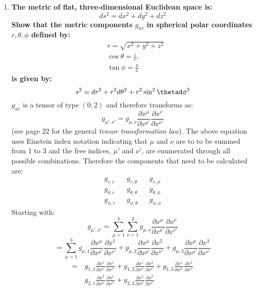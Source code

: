 \documentclass[a4paper]{article}
\begin{document}
\begin{enumerate}
\begin{enumerate}
  \item \textbf{The metric of flat, three-dimensional Euclidean space is:} \[
      ds^2 = dx^2 + dy^2 + dz^2
  \]
  \textbf{Show that the metric components $g_{uv}$ in spherical polar
  coordinates $r, \theta, \phi$ defined by:}
  \[
    \begin{align*}
      &r = \sqrt{x^2 + y^2 + z^2} \\
      &\cos\theta = \frac{z}{r}, \\
      &\tan\phi = \frac{y}{x}
    \end{align*}
  \]
  \textbf{is given by:}
  \[
    s^2 = dr^2 + r^2 d\theta^2 + r^2 \sin^2\thetad\phi^2
  \]
 $g_{uv}$ is a tensor of type $\left( 0,2 \right) $ and therefore transforms as:
  \[
    g_{\mu',\nu'} = g_{\mu,\nu} \frac{\partial x^\mu}{\partial x^{\mu'}}\frac{\partial x^\nu}{\partial x^{\nu'}}
  \]
  (see page 22 for the general \textit{tensor transformation law}). The above
  equation uses Einstein index notation indicating that $\mu$ and $\nu$ are to
  to be summed from 1 to 3 and the free indices, $\mu'$ and $\nu'$, are
  enumerated through all possible combinations. Therefore the components that
  need to be calculated are:
  \[
    \begin{matrix}
      g_{r,r}  && g_{r,\theta} && g_{r,\phi} \\
      g_{\theta, r} && g_{\theta,\theta} && g_{\theta,\phi} \\
      g_{\phi,r} && g_{\phi,\theta} && g_{\phi,\phi}
    \end{matrix}
  \]
  Starting with:
  \[
    g_{\mu',\nu'} =
    \sum_{\mu=1}^{3} \sum_{\nu=1}^{3} g_{\mu,\nu} \frac{\partial x^\mu}{\partial x^{\mu'}} \frac{\partial x^\nu}{\partial x^{\nu'}}
  \]
  \[
    = \sum_{\mu=1}^{3}
    g_{\mu, 1} \frac{\partial x^\mu}{\partial x^{\mu'}} \frac{\partial x^1}{\partial x^{\nu'}} +
    g_{\mu, 2} \frac{\partial x^\mu}{\partial x^{\mu'}} \frac{\partial x^2}{\partial x^{\nu'}} +
    g_{\mu, 3} \frac{\partial x^\mu}{\partial x^{\mu'}} \frac{\partial x^3}{\partial x^{\nu'}}
  \]
  \[
    \begin{align*}
    =&\
     g_{1,1}\frac{\partial x^1}{\partial x^{\mu'}}\frac{\partial x^1}{\partial x^{\nu'}}
    +g_{1,2}\frac{\partial x^1}{\partial x^{\mu'}}\frac{\partial x^2}{\partial x^{\nu'}}
    +g_{1,3}\frac{\partial x^1}{\partial x^{\mu'}}\frac{\partial x^3}{\partial x^{\nu'}}\\
    &\ g_{2,1}\frac{\partial x^2}{\partial x^{\mu'}}\frac{\partial x^1}{\partial x^{\nu'}}
    +g_{2,2}\frac{\partial x^2}{\partial x^{\mu'}}\frac{\partial x^2}{\partial x^{\nu'}}

\end{align*}\]
\end{enumerate}
\end{enumerate}
\end{document}
